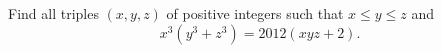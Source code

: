 Find all triples 
$(x,y,z)$
 of positive integers such that 
$x \leq y \leq z$
 and
\[x^3(y^3+z^3)=2012(xyz+2).\]
